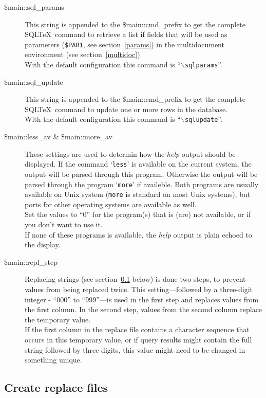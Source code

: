 \documentclass{article}
\newcommand{\bs}{\ensuremath{\backslash}}
\begin{document}
\begin{description}
\item[\$main::sql\_params] This string is appended to the \$main::cmd\_prefix
to get the complete SQL\TeX\ command to retrieve a list if fields that will be
used as parameters (\texttt{\$PAR1}, see section~\ref{params}) in the
multidocument environment (see section~\ref{multidoc}).\\
With the default configuration this command is ``\texttt{\bs sqlparams}''.

\item[\$main::sql\_update] This string is appended to the \$main::cmd\_prefix
to get the complete SQL\TeX\ command to update one or more rows in the database.\\
With the default configuration this command is ``\texttt{\bs sqlupdate}''.

\item[\$main::less\_av \& \$main::more\_av] These settings are used to determin how the \textsl{help} output should be displayed. If the
command `\texttt{less}' is available on the current system, the output will be
parsed through this program. Otherwise the output will be parsed through the
program `\texttt{more}' if availeble. Both programs are usually available on Unix
system (\texttt{more} is standard on most Unix systems), but ports for other
operating systems are available as well.\\
Set the values to ``0'' for the program(s) that is (are) not available, or if
you don't want to use it.\\
If none of these programs is available, the \textsl{help} output is plain echoed
to the display.

\item[\$main::repl\_step] Replacing strings (see section~\ref{replfiles} below) is done two steps, to prevent values from being replaced twice.
This setting---followed by a three-digit integer - ``000'' to ``999''---is used in the first step and replaces values from the first column.
In the second step, values from the second column replace the temporary value. \\
If the first column in the replace file contains a character sequence that occurs in this temporary value, or if query results might contain
the full string followed by three digits, this value might need to be changed in something unique.

\end{description}

\subsection{Create replace files}\label{replfiles}
\end{document}
